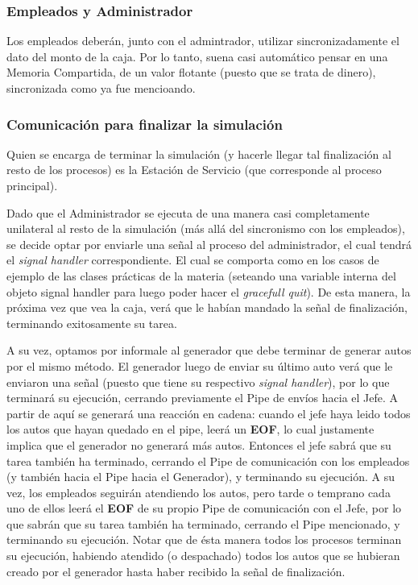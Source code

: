 \documentclass[a4paper,12pt]{article}
\begin{document}
\subsubsection{Empleados y Administrador}
Los empleados deberán, junto con el admintrador, utilizar sincronizadamente el dato del monto de la caja. Por lo tanto, suena casi automático pensar en una Memoria Compartida, de un valor flotante (puesto que se trata de dinero), sincronizada como ya fue mencioando.

\subsubsection{Comunicación para finalizar la simulación}
Quien se encarga de terminar la simulación (y hacerle llegar tal finalización al resto de los procesos) es la Estación de Servicio (que corresponde al proceso principal).

Dado que el Administrador se ejecuta de una manera casi completamente unilateral al resto de la simulación (más allá del sincronismo con los empleados), se decide optar por enviarle una señal al proceso del administrador, el cual tendrá el \textit{signal handler} correspondiente. El cual se comporta como en los casos de ejemplo de las clases prácticas de la materia (seteando una variable interna del objeto signal handler para luego poder hacer el \textit{gracefull quit}). De esta manera, la próxima vez que vea la caja, verá que le habían mandado la señal de finalización, terminando exitosamente su tarea.

A su vez, optamos por informale al generador que debe terminar de generar autos por el mismo método. El generador luego de enviar su último auto verá que le enviaron una señal (puesto que tiene su respectivo \textit{signal handler}), por lo que terminará su ejecución, cerrando previamente el Pipe de envíos hacia el Jefe. A partir de aquí se generará una reacción en cadena: cuando el jefe haya leido todos los autos que hayan quedado en el pipe, leerá un \textbf{EOF}, lo cual justamente implica que el generador no generará más autos. Entonces el jefe sabrá que su tarea también ha terminado, cerrando el Pipe de comunicación con los empleados (y también hacia el Pipe hacia el Generador), y terminando su ejecución. A su vez, los empleados seguirán atendiendo los autos, pero tarde o temprano cada uno de ellos leerá el \textbf{EOF} de su propio Pipe de comunicación con el Jefe, por lo que sabrán que su tarea también ha terminado, cerrando el Pipe mencionado, y terminando su ejecución. Notar que de ésta manera todos los procesos terminan su ejecución, habiendo atendido (o despachado) todos los autos que se hubieran creado por el generador hasta haber recibido la señal de finalización.
\newpage
\end{document}
